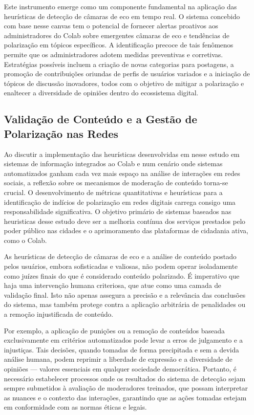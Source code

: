 Este instrumento emerge como um componente fundamental na aplicação das heurísticas de detecção de câmaras de eco em tempo real. O sistema concebido com base nesse canvas tem o potencial de fornecer alertas proativos aos administradores do Colab sobre emergentes câmaras de eco e tendências de polarização em tópicos específicos. A identificação precoce de tais fenômenos permite que os administradores adotem medidas preventivas e corretivas. Estratégias possíveis incluem a criação de novas categorias para postagens, a promoção de contribuições oriundas de perfis de usuários variados e a iniciação de tópicos de discussão inovadores, todos com o objetivo de mitigar a polarização e enaltecer a diversidade de opiniões dentro do ecossistema digital.

\subsection*{Validação de Conteúdo e a Gestão de Polarização nas Redes}

Ao discutir a implementação das heurísticas desenvolvidas em nesse estudo em sistemas de informação integrados ao Colab e num cenário onde sistemas automatizados ganham cada vez mais espaço na análise de interações em redes sociais, a reflexão sobre os mecanismos de moderação de conteúdo torna-se crucial. O desenvolvimento de métricas quantitativas e heurísticas para a identificação de indícios de polarização em redes digitais carrega consigo uma responsabilidade significativa. O objetivo primário de sistemas baseados nas heuristicas desse estudo deve ser a melhoria contínua dos serviços prestados pelo poder público nas cidades e o aprimoramento das plataformas de cidadania ativa, como o Colab.

As heurísticas de detecção de câmaras de eco e a análise de conteúdo postado pelos usuários, embora sofisticadas e valiosas, não podem operar isoladamente como juízes finais do que é considerado conteúdo polarizado. É imperativo que haja uma intervenção humana criteriosa, que atue como uma camada de validação final. Isto não apenas assegura a precisão e a relevância das conclusões do sistema, mas também protege contra a aplicação arbitrária de penalidades ou a remoção injustificada de conteúdo.

Por exemplo, a aplicação de punições ou a remoção de conteúdos baseada exclusivamente em critérios automatizados pode levar a erros de julgamento e a injustiças. Tais decisões, quando tomadas de forma precipitada e sem a devida análise humana, podem reprimir a liberdade de expressão e a diversidade de opiniões — valores essenciais em qualquer sociedade democrática. Portanto, é necessário estabelecer processos onde os resultados do sistema de detecção sejam sempre submetidos à avaliação de moderadores treinados, que possam interpretar as nuances e o contexto das interações, garantindo que as ações tomadas estejam em conformidade com as normas éticas e legais.

